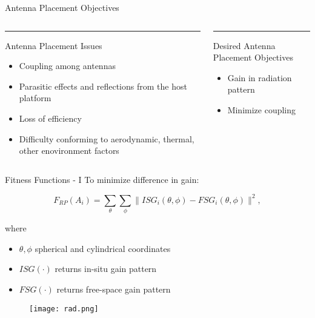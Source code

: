 \documentclass{beamer}
\begin{document}
\begin{frame}[t]{Antenna Placement Objectives}
    \begin{columns}[T]
    \begin{column}{.48\textwidth}
\color{black}\rule{\linewidth}{2pt}
Antenna Placement Issues
\vspace{10px}
\begin{itemize}
    \item[\chemarrow] Coupling among antennas 
    \item[\chemarrow] Parasitic effects and reflections from the host platform 
    \item[\chemarrow] Loss of efficiency
    \item[\chemarrow] Difficulty conforming to aerodynamic, thermal, other enovironment factors 
\end{itemize} 
\end{column}%
\hfill%
\begin{column}{.48\textwidth}
\color{black}\rule{\linewidth}{2pt}
Desired Antenna Placement Objectives
\vspace{10px}
\begin{itemize}
    \item[\chemarrow] Gain in radiation pattern 
    \item [\chemarrow] Minimize coupling
\end{itemize}
\end{column}%
\end{columns}
\end{frame}

\begin{frame}{Fitness Functions - I}
    To minimize difference in gain:
\begin{tcolorbox}[colback=green!5]
\begin{equation} \label{eq:rp}
  F_{RP}(A_i) = \sum_{\theta}\sum_{\phi} 
           \| ISG_i(\theta,\phi) - FSG_i(\theta,\phi) \| ^2,
\end{equation}
\end{tcolorbox}
where
\begin{itemize}
        \small
    \item $\theta, \phi$ spherical and cylindrical coordinates
    \item $ISG(\cdot)$ returns in-situ gain pattern
    \item $FSG(\cdot)$ returns free-space gain pattern  
\end{itemize}
\begin{figure}
    \centering
    \texttt{[image: rad.png]}
\end{figure}

\end{frame}
\end{document}
